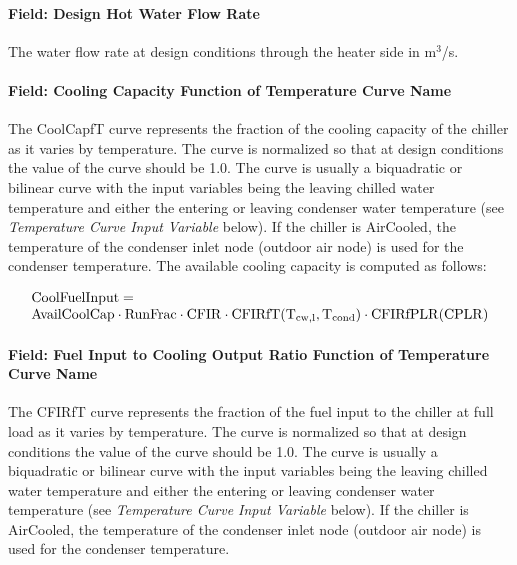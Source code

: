 \paragraph{Field: Design Hot Water Flow Rate}\label{field-design-hot-water-flow-rate}

The water flow rate at design conditions through the heater side in m\(^{3}\)/s.

\paragraph{Field: Cooling Capacity Function of Temperature Curve Name}\label{field-cooling-capacity-function-of-temperature-curve-name-2}

The CoolCapfT curve represents the fraction of the cooling capacity of the chiller as it varies by temperature. The curve is normalized so that at design conditions the value of the curve should be 1.0. The curve is usually a biquadratic or bilinear curve with the input variables being the leaving chilled water temperature and either the entering or leaving condenser water temperature (see \emph{Temperature Curve Input Variable} below). If the chiller is AirCooled, the temperature of the condenser inlet node (outdoor air node) is used for the condenser temperature. The available cooling capacity is computed as follows:

\begin{equation}
    \begin{array}{l}
        \rm{CoolFuelInput} = \\
        \rm{AvailCoolCap} \cdot \rm{RunFrac} \cdot \rm{CFIR} \cdot \rm{CFIRfT}( T_{cw,l}, {T_{\rm{cond}}}) \cdot \rm{CFIRfPLR}( \rm{CPLR} )
    \end{array}
\end{equation}

\paragraph{Field: Fuel Input to Cooling Output Ratio Function of Temperature Curve Name}\label{field-fuel-input-to-cooling-output-ratio-function-of-temperature-curve-name}

The CFIRfT curve represents the fraction of the fuel input to the chiller at full load as it varies by temperature. The curve is normalized so that at design conditions the value of the curve should be 1.0. The curve is usually a biquadratic or bilinear curve with the input variables being the leaving chilled water temperature and either the entering or leaving condenser water temperature (see \emph{Temperature Curve Input Variable} below). If the chiller is AirCooled, the temperature of the condenser inlet node (outdoor air node) is used for the condenser temperature.

